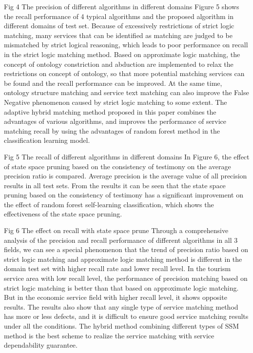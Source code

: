 \documentclass{ieeeaccess}
\begin{document}
Fig 4 The precision of different algorithms in different domains
Figure 5 shows the recall performance of 4 typical algorithms and the proposed algorithm in different domains of test set. Because of excessively restrictions of strict logic matching, many services that can be identified as matching are judged to be mismatched by strict logical reasoning, which leads to poor performance on recall in the strict logic matching method. Based on approximate logic matching, the concept of ontology constriction and abduction are implemented to relax the restrictions on concept of ontology, so that more potential matching services can be found and the recall performance can be improved. At the same time, ontology structure matching and service text matching can also improve the False Negative phenomenon caused by strict logic matching to some extent. The adaptive hybrid matching method proposed in this paper combines the advantages of various algorithms, and improves the performance of service matching recall by using the advantages of random forest method in the classification learning model.
 
Fig 5 The recall of different algorithms in different domains
In Figure 6, the effect of state space pruning based on the consistency of testimony on the average precision ratio is compared. Average precision is the average value of all precision results in all test sets. From the results it can be seen that the state space pruning based on the consistency of testimony has a significant improvement on the effect of random forest self-learning classification, which shows the effectiveness of the state space pruning.
 
Fig 6 The effect on recall with state space prune
Through a comprehensive analysis of the precision and recall performance of different algorithms in all 3 fields, we can see a special phenomenon that the trend of precision ratio based on strict logic matching and approximate logic matching method is different in the domain test set with higher recall rate and lower recall level. In the tourism service area with low recall level, the performance of precision matching based on strict logic matching is better than that based on approximate logic matching. But in the economic service field with higher recall level, it shows opposite results. The results also show that any single type of service matching method has more or less defects, and it is difficult to ensure good service matching results under all the conditions. The hybrid method combining different types of SSM method is the best scheme to realize the service matching with service dependability guarantee.
\end{document}
